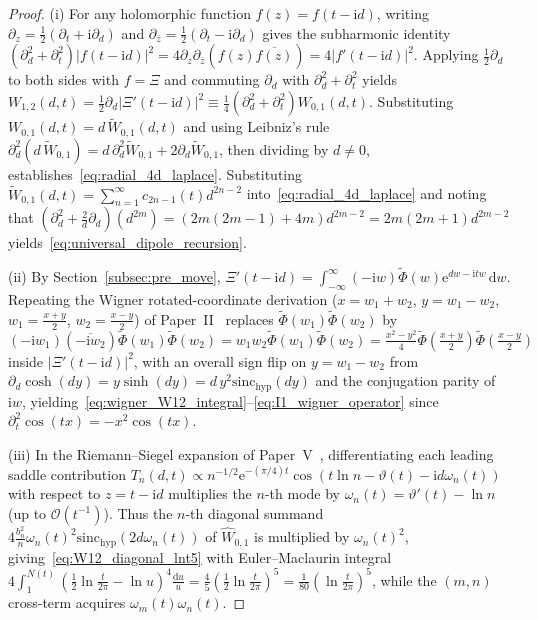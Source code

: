 \documentclass[11pt,reqno]{amsart}
\theoremstyle{definition}
\theoremstyle{remark}
\numberwithin{equation}{section}
\newcommand{\dd}{\mathrm{d}}
\newcommand{\ee}{\mathrm{e}}
\newcommand{\ii}{\mathrm{i}}
\newcommand{\sinch}{\mathrm{sinc}_{\mathrm{hyp}}}
\begin{document}
\begin{proof}
(i) For any holomorphic function $f(z) = f(t-\ii d)$, writing $\partial_z = \frac{1}{2}(\partial_t + \ii\partial_d)$ and $\partial_{\bar{z}} = \frac{1}{2}(\partial_t - \ii\partial_d)$ gives the subharmonic identity $(\partial_d^2 + \partial_t^2)|f(t-\ii d)|^2 = 4\partial_z\partial_{\bar{z}}(f(z)\overline{f(z)}) = 4|f'(t-\ii d)|^2$. Applying $\frac{1}{2}\partial_d$ to both sides with $f = \Xi$ and commuting $\partial_d$ with $\partial_d^2 + \partial_t^2$ yields $W_{1,2}(d,t) = \frac{1}{2}\partial_d|\Xi'(t-\ii d)|^2 \equiv \frac{1}{4}(\partial_d^2 + \partial_t^2)W_{0,1}(d,t)$. Substituting $W_{0,1}(d,t) = d\,\widetilde{W}_{0,1}(d,t)$ and using Leibniz's rule $\partial_d^2(d\,\widetilde{W}_{0,1}) = d\,\partial_d^2\widetilde{W}_{0,1} + 2\partial_d\widetilde{W}_{0,1}$, then dividing by $d \neq 0$, establishes~\eqref{eq:radial_4d_laplace}. Substituting $\widetilde{W}_{0,1}(d,t) = \sum_{n=1}^\infty c_{2n-1}(t)d^{2n-2}$ into~\eqref{eq:radial_4d_laplace} and noting that $(\partial_d^2 + \frac{2}{d}\partial_d)(d^{2m}) = (2m(2m-1) + 4m)d^{2m-2} = 2m(2m+1)d^{2m-2}$ yields~\eqref{eq:universal_dipole_recursion}.

(ii) By Section~\ref{subsec:pre_move}, $\Xi'(t-\ii d) = \int_{-\infty}^\infty (-\ii w)\widetilde{\Phi}(w)\ee^{dw - \ii tw}\,\dd w$. Repeating the Wigner rotated-coordinate derivation ($x = w_1 + w_2$, $y = w_1 - w_2$, $w_1 = \frac{x+y}{2}$, $w_2 = \frac{x-y}{2}$) of Paper~II~\cite{missiaen2026paper2} replaces $\widetilde{\Phi}(w_1)\widetilde{\Phi}(w_2)$ by $(-\ii w_1)(\overline{-\ii w_2})\widetilde{\Phi}(w_1)\widetilde{\Phi}(w_2) = w_1 w_2\widetilde{\Phi}(w_1)\widetilde{\Phi}(w_2) = \frac{x^2 - y^2}{4}\widetilde{\Phi}(\frac{x+y}{2})\widetilde{\Phi}(\frac{x-y}{2})$ inside $|\Xi'(t-\ii d)|^2$, with an overall sign flip on $y = w_1 - w_2$ from $\partial_d \cosh(dy) = y\sinh(dy) = d\,y^2\sinch(dy)$ and the conjugation parity of $\ii w$, yielding~\eqref{eq:wigner_W12_integral}--\eqref{eq:I1_wigner_operator} since $\partial_t^2\cos(tx) = -x^2\cos(tx)$.

(iii) In the Riemann--Siegel expansion of Paper~V~\cite{missiaen2026paper5}, differentiating each leading saddle contribution $T_n(d,t) \propto n^{-1/2}\ee^{-(\pi/4)t}\cos(t\ln n - \vartheta(t) - \ii d\omega_n(t))$ with respect to $z = t - \ii d$ multiplies the $n$-th mode by $\omega_n(t) = \vartheta'(t) - \ln n$ (up to $\mathcal{O}(t^{-1})$). Thus the $n$-th diagonal summand $4\frac{b_n^2}{n}\omega_n(t)^2\sinch(2d\omega_n(t))$ of $\widehat{W}_{0,1}$ is multiplied by $\omega_n(t)^2$, giving~\eqref{eq:W12_diagonal_lnt5} with Euler--Maclaurin integral $4\int_1^{N(t)} (\frac{1}{2}\ln\frac{t}{2\pi} - \ln u)^4\frac{\dd u}{u} = \frac{4}{5}(\frac{1}{2}\ln\frac{t}{2\pi})^5 = \frac{1}{80}(\ln\frac{t}{2\pi})^5$, while the $(m,n)$ cross-term acquires $\omega_m(t)\omega_n(t)$.
\end{proof}
\end{document}
